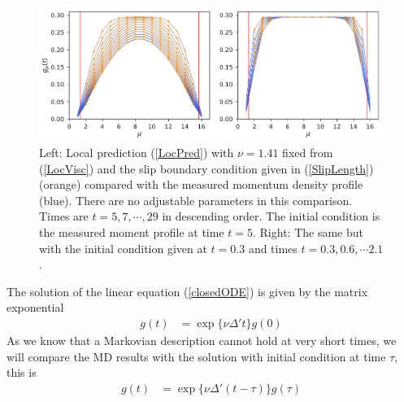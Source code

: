 \documentclass[b5paper,openright,10pt]{book}
\begin{document}
\begin{figure}[]
\includegraphics[width=\linewidth]{gxtLocalPrediction-17nodes-WALLS}
\caption[Local prediction from local viscosity and slip boundary condition]{Left: Local  prediction (\ref{LocPred}) with  $\nu=1.41$ fixed
  from  (\ref{LocVisc})  and  the  slip boundary  condition  given  in
  (\ref{SlipLength}) (orange) compared with the measured momentum density
  profile  (blue).   There  are   no  adjustable  parameters  in  this
  comparison. Times  are $t=5,7,\cdots,29$  in descending  order.  The
  initial   condition  is   the  measured   moment  profile   at  time
  $t=5$.  Right: The  same but  with the  initial condition  given at
  $t=0.3$ and times $t=0.3,0.6,\cdots2.1$.}
\label{Fig:LocalPrediction}
\end{figure}

The solution of the linear equation (\ref{closedODE}) is given by the matrix exponential
\begin{align}
 g(t)&=\exp\{\nu \Delta' t\}g(0)
\end{align}
As we know that a Markovian description cannot hold at very short times,
we will compare the MD results with the solution with initial condition
at time $\tau$, this is
\begin{align}
 g(t)&=\exp\{\nu \Delta' (t-\tau)\}g(\tau)
\label{LocPred}
\end{align}

\end{document}
